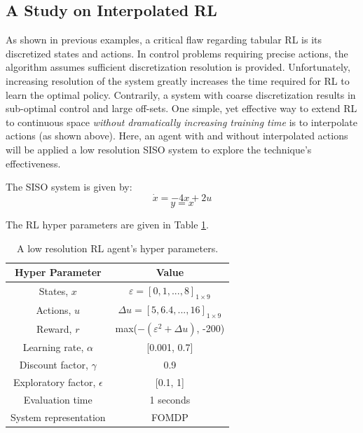 \subsection{A Study on Interpolated RL}
As shown in previous examples, a critical flaw regarding tabular RL is its discretized states and actions. In control problems requiring precise actions, the algorithm assumes sufficient discretization resolution is provided.  Unfortunately, increasing resolution of the system greatly increases the time required for RL to learn the optimal policy. Contrarily, a system with coarse discretization results in sub-optimal control and large off-sets. One simple, yet effective way to extend RL to continuous space \textit{without dramatically increasing training time} is to interpolate actions (as shown above).  Here, an agent with and without interpolated actions will be applied a low resolution SISO system to explore the technique's effectiveness.

The SISO system is given by:
$$\dot{x} = -4x + 2u$$
$$y = x$$

The RL hyper parameters are given in Table \ref{tab:04RL_lowres}.  

\begin{table}[H]
\caption{A low resolution RL agent's hyper parameters.}
\label{tab:04RL_lowres}
\centering
\begin{tabular}{c|c}
\textbf{Hyper Parameter}     & Value  \\
\hline
States, $x$	             	& $\varepsilon = [0, 1, ..., 8]_{1 \times 9} $		 \\
Actions, $u$               & $\Delta u = [5, 6.4, ..., 16]_{1 \times 9}$		\\
Reward, $r$	               & max($-(\varepsilon^2 + \Delta u)$, -200)		\\
Learning rate, $\alpha$		& [0.001, 0.7]		 \\
Discount factor, $\gamma$      	& 0.9  \\
Exploratory factor, $\epsilon$             & [0.1, 1]  \\
Evaluation time                 & 1 seconds \\
System representation           & FOMDP \\
\end{tabular}
\end{table}


